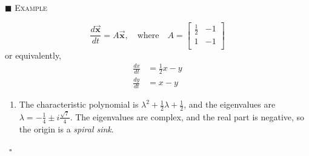 \documentclass[reqno]{immbook}
\newcommand{\BX}{\vec{\textbf{x}}}
\numberwithin{equation}{chapter}
\numberwithin{question}{section}
\numberwithin{theorem}{chapter}
\numberwithin{figure}{chapter}
\theoremstyle{definition}
\newenvironment{xexample}%
{%

\medskip\noindent\addtocounter{example}{1}$\blacksquare$ \textsc{Example \theexample}\hspace*{1em}%
}%
{%
~\hfill$\square$

\medskip
}
\begin{document}
\begin{xexample}
\[
  \frac{d\BX}{dt} = A \BX, \quad \textrm{where} \quad
    A = \begin{bmatrix}
                   \frac{1}{2} & -1 \\
		   1 & -1 \\
        \end{bmatrix}
\]
or equivalently,
\[
\begin{split}
   \frac{dx}{dt} & = \frac{1}{2} x - y \\
   \frac{dy}{dt} & = x - y
\end{split}
\]
\begin{enumerate}
\item
The characteristic polynomial is $\lambda^2 +\frac{1}{2}\lambda+\frac{1}{2}$,
and the eigenvalues are
$\lambda = -\frac{1}{4}\pm i \frac{\sqrt{7}}{4}$.
The eigenvalues are complex,
and the real part is negative,
so the origin is a \emph{spiral sink}.


\end{enumerate}
\end{xexample}
\end{document}

